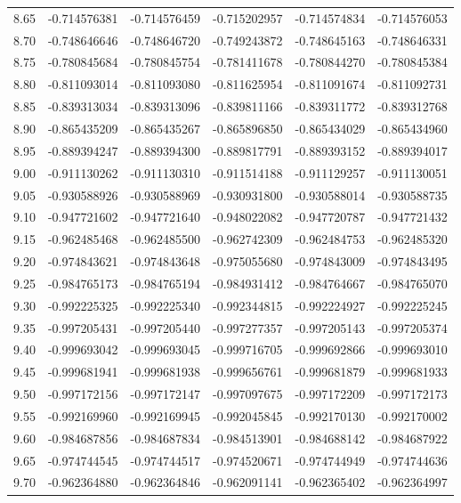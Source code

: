 \documentclass[11pt,a4paper]{article}
\begin{document}
\begin{longtable}{rrrrrr}
8.65 & -0.714576381 & -0.714576459 & -0.715202957 & -0.714574834 & -0.714576053 \\
8.70 & -0.748646646 & -0.748646720 & -0.749243872 & -0.748645163 & -0.748646331 \\
8.75 & -0.780845684 & -0.780845754 & -0.781411678 & -0.780844270 & -0.780845384 \\
8.80 & -0.811093014 & -0.811093080 & -0.811625954 & -0.811091674 & -0.811092731 \\
8.85 & -0.839313034 & -0.839313096 & -0.839811166 & -0.839311772 & -0.839312768 \\
8.90 & -0.865435209 & -0.865435267 & -0.865896850 & -0.865434029 & -0.865434960 \\
8.95 & -0.889394247 & -0.889394300 & -0.889817791 & -0.889393152 & -0.889394017 \\
9.00 & -0.911130262 & -0.911130310 & -0.911514188 & -0.911129257 & -0.911130051 \\
9.05 & -0.930588926 & -0.930588969 & -0.930931800 & -0.930588014 & -0.930588735 \\
9.10 & -0.947721602 & -0.947721640 & -0.948022082 & -0.947720787 & -0.947721432 \\
9.15 & -0.962485468 & -0.962485500 & -0.962742309 & -0.962484753 & -0.962485320 \\
9.20 & -0.974843621 & -0.974843648 & -0.975055680 & -0.974843009 & -0.974843495 \\
9.25 & -0.984765173 & -0.984765194 & -0.984931412 & -0.984764667 & -0.984765070 \\
9.30 & -0.992225325 & -0.992225340 & -0.992344815 & -0.992224927 & -0.992225245 \\
9.35 & -0.997205431 & -0.997205440 & -0.997277357 & -0.997205143 & -0.997205374 \\
9.40 & -0.999693042 & -0.999693045 & -0.999716705 & -0.999692866 & -0.999693010 \\
9.45 & -0.999681941 & -0.999681938 & -0.999656761 & -0.999681879 & -0.999681933 \\
9.50 & -0.997172156 & -0.997172147 & -0.997097675 & -0.997172209 & -0.997172173 \\
9.55 & -0.992169960 & -0.992169945 & -0.992045845 & -0.992170130 & -0.992170002 \\
9.60 & -0.984687856 & -0.984687834 & -0.984513901 & -0.984688142 & -0.984687922 \\
9.65 & -0.974744545 & -0.974744517 & -0.974520671 & -0.974744949 & -0.974744636 \\
9.70 & -0.962364880 & -0.962364846 & -0.962091141 & -0.962365402 & -0.962364997 \\

\end{longtable}
\end{document}
